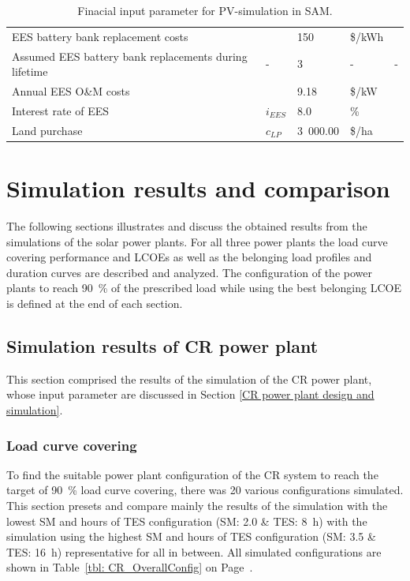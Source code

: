 \begin{table}[!h]
\begin{tabular}{  p{5.5cm} C{1.5cm} C{1.5cm}  C{1.5cm}  C{4.0cm} }
EES battery bank replacement costs & & 150 & \$/kWh & \cite{Zakeri2015} \\ 
Assumed EES battery bank replacements during lifetime & - & 3 & - & - \\ 
Annual EES O\&M costs & & 9.18 & \$/kW & \cite{Zakeri2015}\\
Interest rate of EES & $i_{EES}$& 8.0 & \% & \cite{Zakeri2015} \\ \hline
Land purchase &$c_{LP}$ & 3~000.00 & \$/ha & \cite{Cassell2012} \\ 
\hline
\end{tabular}
\caption[Finacial input parameter for PV-simulation in SAM.]{Finacial input parameter for PV-simulation in SAM.}\label{tbl: PVFinance}
\end{table}
\pagebreak
\section{Simulation results and comparison}
The following sections illustrates and discuss the obtained results from the simulations of the solar power plants. For all three power plants the load curve covering performance and LCOEs as well as the belonging load profiles and duration curves are described and analyzed. The configuration of the power plants to reach 90~\% of the prescribed load while using the best belonging LCOE is defined at the end of each section.
\subsection{Simulation results of CR power plant}
This section comprised the results of the simulation of the CR power plant, whose input parameter are discussed in Section \ref{CR power plant design  and simulation}. 
\subsubsection{Load curve covering}
To find the suitable power plant configuration of the CR system to reach the target of 90~\% load curve covering, there was 20 various configurations simulated. This section presets and compare mainly the results of the simulation with the lowest SM and hours of TES configuration (SM: 2.0 \& TES: 8~h) with the simulation using the highest SM and hours of TES configuration (SM: 3.5 \& TES: 16~h) representative for all in between. All simulated configurations are shown in Table~\ref{tbl: CR_OverallConfig} on Page~\pageref{tbl: CR_OverallConfig}.

